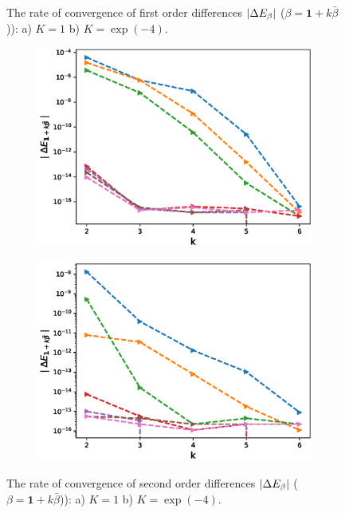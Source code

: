 \documentclass[11pt]{article}
\begin{document}
\begin{figure}[h!]
\caption{The rate of convergence of  first order differences $\left\lvert\Delta E_{\beta}\right\rvert$ ($\beta=\mathbf{1}+k \bar{\beta}$)): a) $K=1$ b)  $K=\operatorname{exp}(-4).$}
\label{fig:test2}
\end{figure}

\begin{figure}[h!]
\centering
\begin{subfigure}{.5\textwidth}
\centering
\includegraphics[width=1\linewidth]{./figures/mixed_diff_second_way/H_043/N_8/mixed_difference_order2_rbergomi_8steps_H_043_K_1.eps}
\caption{}
\label{fig:sub3}
\end{subfigure}%
\begin{subfigure}{.5\textwidth}
\centering
\includegraphics[width=1\linewidth]{./figures/mixed_diff_second_way/H_043/N_8/mixed_difference_order2_rbergomi_8steps_H_043_K_exp__4.eps}
\caption{}
\label{fig:sub4}
\end{subfigure}

\caption{The rate of convergence of  second order differences $\left\lvert\Delta E_{\beta}\right\rvert$ ($\beta=\mathbf{1}+k \bar{\beta}$)): a) $K=1$ b)  $K=\operatorname{exp}(-4).$}
\label{fig:test2}
\end{figure}
\end{document}
